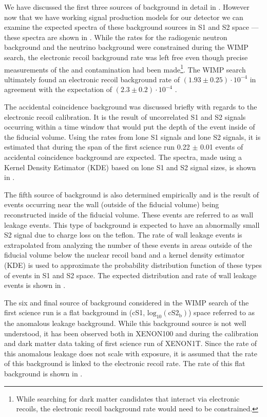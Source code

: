 We have discussed the first three sources of background in detail in .  However now that we have working signal production models for our detector we can examine the expected spectra of these background sources in S1 and S2 space --- these spectra are shown in .  While the rates for the radiogenic neutron background and the neutrino background were constrained during the WIMP search, the electronic recoil background rate was left free even though precise measurements of the \krypton{} and \radon{} contamination had been made\footnote{While searching for dark matter candidates that interact via electronic recoils, the electronic recoil background rate would need to be constrained.}.  The WIMP search ultimately found an electronic recoil background rate of $(1.93 \pm 0.25) \cdot 10^{-4}$ \dru{} in agreement with the expectation of $(2.3 \pm 0.2) \cdot 10^{-4}$ \dru{} \cite{aprile2017first}.

The accidental coincidence background was discussed briefly with regards to the electronic recoil calibration.  It is the result of uncorrelated S1 and S2 signals occurring within a time window that would put the depth of the event inside of the fiducial volume.    Using the rates from lone S1 signals and lone S2 signals, it is estimated that during the span of the first science run 0.22 $\pm$ 0.01 events of accidental coincidence background are expected.  The spectra, made using a Kernel Density Estimator (KDE) based on lone S1 and S2 signal sizes, is shown in .

The fifth source of background is also determined empirically and is the result of events occurring near the wall (outside of the fiducial volume) being reconstructed inside of the fiducial volume.  These events are referred to as wall leakage events.  This type of background is expected to have an abnormally small S2 signal due to charge loss on the teflon.  The rate of wall leakage events is extrapolated from analyzing the number of these events in areas outside of the fiducial volume below the nuclear recoil band and a kernel density estimator (KDE) is used to approximate the probability distribution function of these types of events in S1 and S2 space.  The expected distribution and rate of wall leakage events is shown in .

The six and final source of background considered in the WIMP search of the first science run is a flat background in (cS1, $\textrm{log}_{10}(\textrm{cS2}_\textrm{b})$) space referred to as the anomalous leakage background.  While this background source is not well understood, it has been observed both in XENON100 \cite{aprile2016xenon100} and during the  calibration and dark matter data taking of first science run of XENON1T.  Since the rate of this anomalous leakage does not scale with exposure, it is assumed that the rate of this background is linked to the electronic recoil rate.  The rate of this flat background is shown in .

